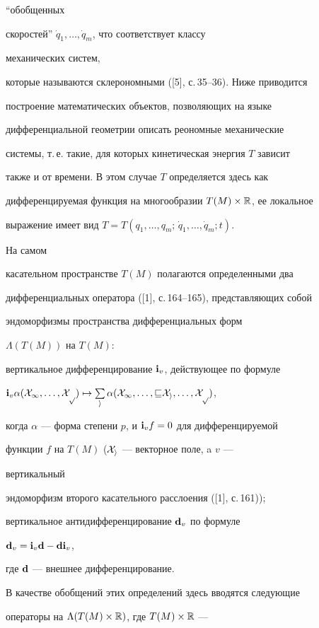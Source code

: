 ``обобщенных 


скоростей'' $\Dot q_1,\dotsc,\Dot q_m$, что соответствует классу 


механических систем, 


которые называются склерономными ([5], с.\,35--36). Ниже приводится 


построение математических объектов, позволяющих на языке 


дифференциальной геометрии описать реономные механические 


системы, т.\,е. такие, для которых кинетическая энергия $T$ зависит 


также и от времени. В этом случае $T$ определяется здесь как 


дифференцируемая функция на многообразии $T(M)\times\Bbb R$, ее локальное 


выражение имеет вид $T=T(q_1,\dotsc,q_m;\,\Dot q_1,\dotsc,\Dot q_m;t)$. 


На самом 


касательном пространстве $T(M)$ полагаются определенными два 


дифференциальных оператора ([1], с.\,164--165), представляющих собой 


эндоморфизмы пространства дифференциальных форм 


$\Lambda(T(M))$ на $T(M)$: 


вертикальное дифференцирование $\bold i_v$, действующее по формуле 


$\bold i_v\alpha(\cal X_1,\dotsc,\cal X_p)\mapsto \sum\limits_i \alpha(\cal 


X_1,\dotsc,v\cal X_i,\dotsc,\cal X_p)$, 


когда $\alpha$ --- форма степени $p$, и $\bold i_v f=0$ для дифференцируемой 


функции $f$ на $T(M)$ ($\cal X_i$ --- векторное поле, a $v$ --- 


вертикальный 


эндоморфизм второго касательного расслоения ([1], с.\,161)); 


вертикальное антидифференцирование $\bold d_v$ по формуле


$\bold d_v=\bold i_v \bold d-\bold d \bold i_v$, 


где $\bold d$ --- внешнее дифференцирование. 


 


В качестве обобщений этих определений здесь вводятся следующие 


операторы на $\Lambda(T(M)\times\Bbb R)$, где $T(M)\times\Bbb R$ --- 


